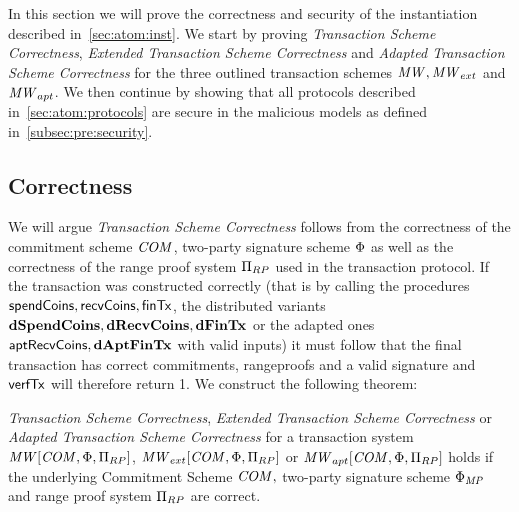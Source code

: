 In this section we will prove the correctness and security of the instantiation described in~\cref{sec:atom:inst}.
We start by proving \emph{Transaction Scheme Correctness}, \emph{Extended Transaction Scheme Correctness} and \emph{Adapted Transaction Scheme Correctness} for the three outlined transaction schemes $\mathit{MW}, \mathit{MW}_{ext}$ and $\mathit{MW}_{apt}$.
We then continue by showing that all protocols described in~\cref{sec:atom:protocols} are secure in the malicious models as defined in~\cref{subsec:pre:security}.

\subsection{Correctness} \label{subsec:atom:correctness}

We will argue \emph{Transaction Scheme Correctness} follows from the correctness of the commitment scheme $\mathit{COM}$, two-party signature scheme $\Phi$ as well as the correctness of the range proof system $\Pi_{RP}$ used in the transaction protocol.
If the transaction was constructed correctly (that is by calling the procedures $\mathsf{spendCoins}, \mathsf{recvCoins}, \mathsf{finTx}$, the distributed variants $\mathbf{dSpendCoins}, \mathbf{dRecvCoins}, \mathbf{dFinTx}$ or the adapted ones $\mathsf{aptRecvCoins}, \mathbf{dAptFinTx}$ with valid inputs) it must follow that the final transaction has correct commitments, rangeproofs and a valid signature and $\mathsf{verfTx}$ will therefore return 1.
We construct the following theorem:

\begin{theorem}
    \label{lem:atom:correctness}
    \emph{Transaction Scheme Correctness}, \emph{Extended Transaction Scheme Correctness} or \emph{Adapted Transaction Scheme Correctness} for a transaction system $\mathit{MW}[\mathit{COM},\Phi,\Pi_{RP}]$, $\mathit{MW}_{ext}[\mathit{COM},\Phi,\Pi_{RP}]$ or $\mathit{MW}_{apt}[\mathit{COM},\Phi,\Pi_{RP}]$ holds if the underlying Commitment Scheme $\mathit{COM},$ two-party signature scheme $\Phi_{\mathit{MP}}$ and range proof system $\Pi_{RP}$ are correct.
\end{theorem}

